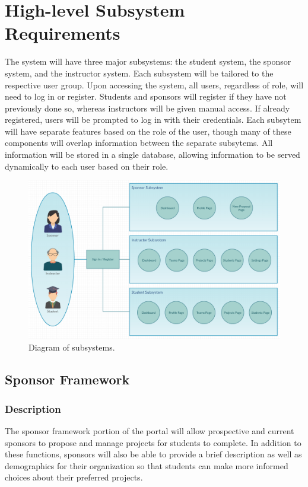 \documentclass[12pt]{article}
\begin{document}
\section{High-level Subsystem Requirements}
The system will have three major subsystems: the student system, the sponsor system, and the instructor system. Each subsystem will be tailored to the respective user group. Upon accessing the system, all users, regardless of role, will need to log in or register. Students and sponsors will register if they have not previously done so, whereas instructors will be given manual access. If already registered, users will be prompted to log in with their credentials. Each subsytem will have separate features based on the role of the user, though many of these components will overlap information between the separate subsytems. All information will be stored in a single database, allowing information to be served dynamically to each user based on their role.
\begin{figure}[!htb]
	\includegraphics[width=\linewidth]{subsystems.png}
	\caption{Diagram of subsystems.}
	\label{fig:subsystems}
\end{figure}
\FloatBarrier

\subsection{Sponsor Framework}

\subsubsection{Description}

The sponsor framework portion of the portal will allow prospective and current sponsors to propose and manage projects for students to complete. In addition to these functions, sponsors will also be able to provide a brief description as well as demographics for their organization so that students can make more informed choices about their preferred projects.
\end{document}
